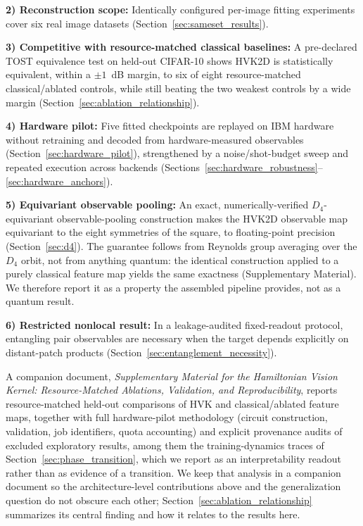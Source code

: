 \documentclass[sn-mathphys,Numbered]{sn-jnl}
\begin{document}
\noindent\textbf{2) Reconstruction scope:} Identically configured per-image fitting experiments cover six real image datasets (Section~\ref{sec:sameset_results}).

\noindent\textbf{3) Competitive with resource-matched classical baselines:} A pre-declared TOST equivalence test on held-out CIFAR-10 shows HVK2D is statistically equivalent, within a $\pm1$~dB margin, to six of eight resource-matched classical/ablated controls, while still beating the two weakest controls by a wide margin (Section~\ref{sec:ablation_relationship}).

\noindent\textbf{4) Hardware pilot:} Five fitted checkpoints are replayed on IBM hardware without retraining and decoded from hardware-measured observables (Section~\ref{sec:hardware_pilot}), strengthened by a noise/shot-budget sweep and repeated execution across backends (Sections~\ref{sec:hardware_robustness}--\ref{sec:hardware_anchors}).

\noindent\textbf{5) Equivariant observable pooling:} An exact, numerically-verified $D_4$-equivariant observable-pooling construction makes the HVK2D observable map equivariant to the eight symmetries of the square, to floating-point precision (Section~\ref{sec:d4}). The guarantee follows from Reynolds group averaging over the $D_4$ orbit, not from anything quantum: the identical construction applied to a purely classical feature map yields the same exactness (Supplementary Material). We therefore report it as a property the assembled pipeline provides, not as a quantum result.

\noindent\textbf{6) Restricted nonlocal result:} In a leakage-audited fixed-readout protocol, entangling pair observables are necessary when the target depends explicitly on distant-patch products (Section~\ref{sec:entanglement_necessity}).

A companion document, \textit{Supplementary Material for the Hamiltonian Vision Kernel: Resource-Matched Ablations, Validation, and Reproducibility}, reports resource-matched held-out comparisons of HVK and classical/ablated feature maps, together with full hardware-pilot methodology (circuit construction, validation, job identifiers, quota accounting) and explicit provenance audits of excluded exploratory results, among them the training-dynamics traces of Section~\ref{sec:phase_transition}, which we report as an interpretability readout rather than as evidence of a transition. We keep that analysis in a companion document so the architecture-level contributions above and the generalization question do not obscure each other; Section~\ref{sec:ablation_relationship} summarizes its central finding and how it relates to the results here.
\end{document}
